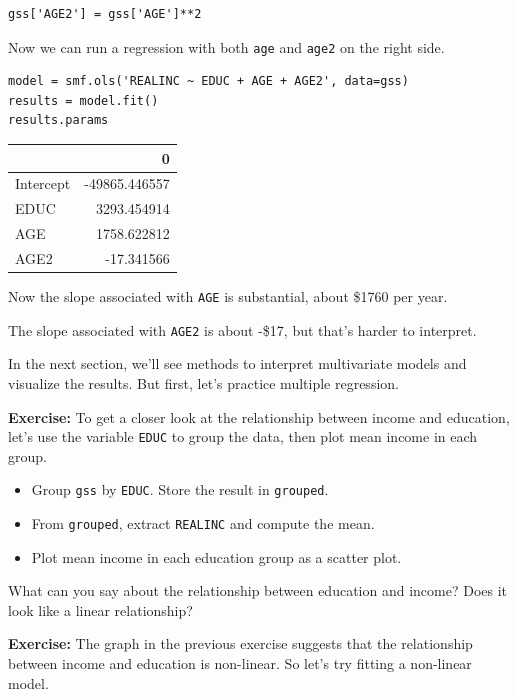 \begin{lstlisting}[]
gss['AGE2'] = gss['AGE']**2
\end{lstlisting}

Now we can run a regression with both \passthrough{\lstinline!age!} and
\passthrough{\lstinline!age2!} on the right side.

\begin{lstlisting}[]
model = smf.ols('REALINC ~ EDUC + AGE + AGE2', data=gss)
results = model.fit()
results.params
\end{lstlisting}

\begin{tabular}{lr}
\midrule
{} &             0 \\
\midrule
Intercept & -49865.446557 \\
EDUC      &   3293.454914 \\
AGE       &   1758.622812 \\
AGE2      &    -17.341566 \\
\midrule
\end{tabular}

Now the slope associated with \passthrough{\lstinline!AGE!} is
substantial, about \$1760 per year.

The slope associated with \passthrough{\lstinline!AGE2!} is about -\$17,
but that's harder to interpret.

In the next section, we'll see methods to interpret multivariate models
and visualize the results. But first, let's practice multiple
regression.

\textbf{Exercise:} To get a closer look at the relationship between
income and education, let's use the variable
\passthrough{\lstinline!EDUC!} to group the data, then plot mean income
in each group.

\begin{itemize}
\item
  Group \passthrough{\lstinline!gss!} by \passthrough{\lstinline!EDUC!}.
  Store the result in \passthrough{\lstinline!grouped!}.
\item
  From \passthrough{\lstinline!grouped!}, extract
  \passthrough{\lstinline!REALINC!} and compute the mean.
\item
  Plot mean income in each education group as a scatter plot.
\end{itemize}

What can you say about the relationship between education and income?
Does it look like a linear relationship?

\textbf{Exercise:} The graph in the previous exercise suggests that the
relationship between income and education is non-linear. So let's try
fitting a non-linear model.

